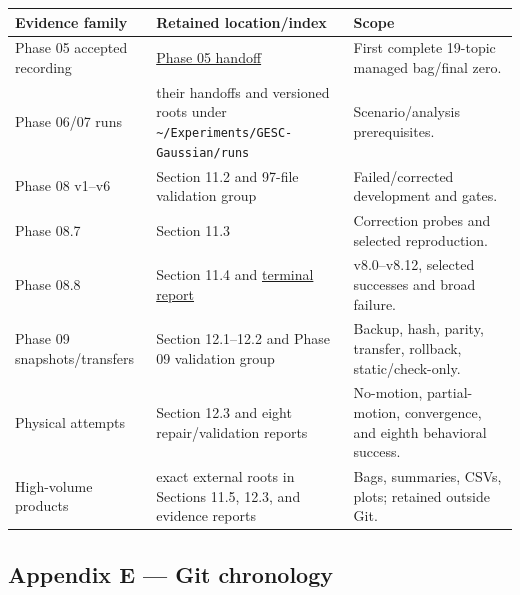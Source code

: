 \documentclass[
  10pt,
  letterpaper,
]{article}
\newcounter{none} %
\begin{document}
{\def\LTcaptype{none} %
\begin{longtable}[]{@{}
  >{\raggedright\arraybackslash}p{}
  >{\raggedright\arraybackslash}p{}
  >{\raggedright\arraybackslash}p{}@{}}
\toprule\noalign{}
\begin{minipage}[b]{\linewidth}\raggedright
Evidence family
\end{minipage} & \begin{minipage}[b]{\linewidth}\raggedright
Retained location/index
\end{minipage} & \begin{minipage}[b]{\linewidth}\raggedright
Scope
\end{minipage} \\
\midrule\noalign{}
\endhead
\bottomrule\noalign{}
\endlastfoot
Phase 05 accepted recording & \href{handoffs/phase_05_handoff.md}{Phase 05 handoff} & First complete 19-topic managed bag/final zero. \\
Phase 06/07 runs & their handoffs and versioned roots under \nolinkurl{\~/Experiments/GESC-Gaussian/runs} & Scenario/analysis prerequisites. \\
Phase 08 v1--v6 & Section 11.2 and 97-file validation group & Failed/corrected development and gates. \\
Phase 08.7 & Section 11.3 & Correction probes and selected reproduction. \\
Phase 08.8 & Section 11.4 and \href{validation/phase_08_8_final_report.md}{terminal report} & v8.0--v8.12, selected successes and broad failure. \\
Phase 09 snapshots/transfers & Section 12.1--12.2 and Phase 09 validation group & Backup, hash, parity, transfer, rollback, static/check-only. \\
Physical attempts & Section 12.3 and eight repair/validation reports & No-motion, partial-motion, convergence, and eighth behavioral success. \\
High-volume products & exact external roots in Sections 11.5, 12.3, and evidence reports & Bags, summaries, CSVs, plots; retained outside Git. \\
\end{longtable}
}

\subsection{Appendix E --- Git chronology}\label{appendix-e-git-chronology}
\end{document}
